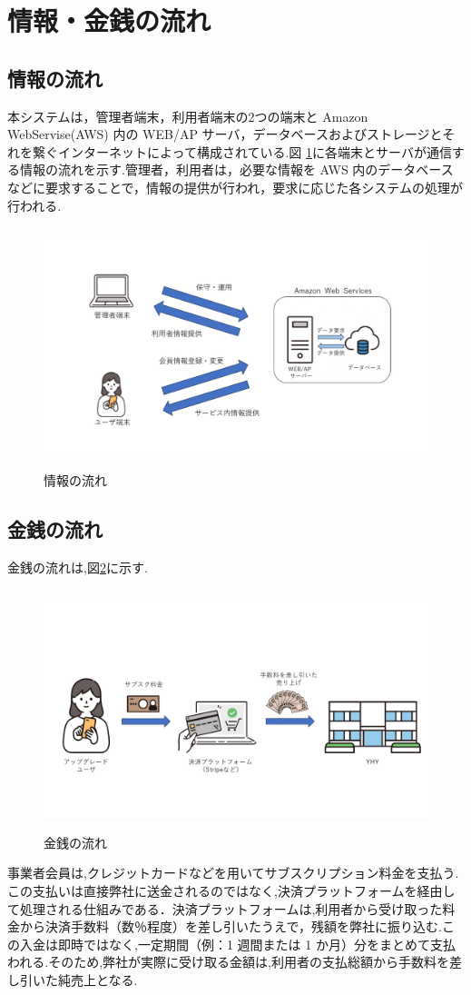 \section{情報・金銭の流れ}
\subsection{情報の流れ}
本システムは，管理者端末，利用者端末の2つの端末と Amazon WebServise(AWS) 内の WEB/AP サーバ，データベースおよびストレージとそれを繋ぐインターネットによって構成されている.図 \ref{fig:Q7}に各端末とサーバが通信する情報の流れを示す.管理者，利用者は，必要な情報を AWS 内のデータベースなどに要求することで，情報の提供が行われ，要求に応じた各システムの処理が行われる.

\begin{figure}[H]
        \centering
        \includegraphics[width=12cm, height=7cm]{sections/pictures/4-1_info.jpg}
        \caption{情報の流れ}
        \label{fig:Q7}
\end{figure}



\subsection{金銭の流れ}
金銭の流れは,図\ref{fig:Q8}に示す.

\begin{figure}[H]
        \centering
        \includegraphics[width=12cm, height=7cm]{sections/pictures/4-2_money.jpg}
        \caption{金銭の流れ}
        \label{fig:Q8}
\end{figure}

事業者会員は,クレジットカードなどを用いてサブスクリプション料金を支払う.この支払いは直接弊社に送金されるのではなく,決済プラットフォームを経由して処理される仕組みである．決済プラットフォームは,利用者から受け取った料金から決済手数料（数％程度）を差し引いたうえで，残額を弊社に振り込む.この入金は即時ではなく,一定期間（例：1 週間または 1 か月）分をまとめて支払われる.そのため,弊社が実際に受け取る金額は,利用者の支払総額から手数料を差し引いた純売上となる.







